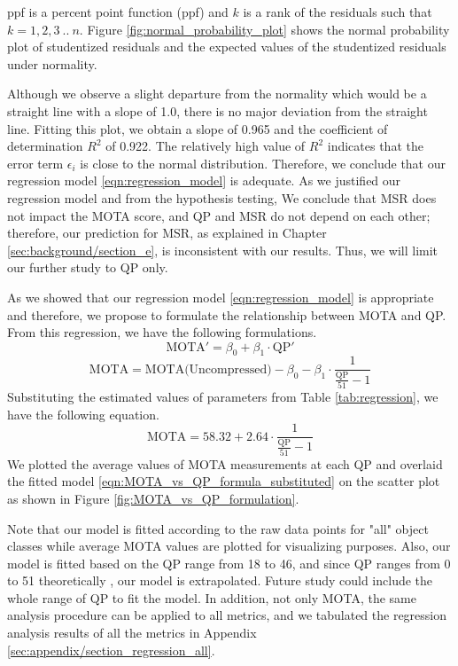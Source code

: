 ppf is a percent point function (ppf) and $k$ is a rank of the residuals such that $k=1,2,3~..~n$. Figure \ref{fig:normal_probability_plot} shows the normal probability plot of studentized residuals and the expected values of the studentized residuals under normality.

Although we observe a slight departure from the normality which would be a straight line with a slope of 1.0, there is no major deviation from the straight line. Fitting this plot, we obtain a slope of 0.965 and the coefficient of determination $R^2$ of 0.922. The relatively high value of $R^2$ indicates that the error term $\epsilon_i$ is close to the normal distribution. Therefore, we conclude that our regression model \eqref{eqn:regression_model} is adequate. As we justified our regression model and from the hypothesis testing, We conclude that MSR does not impact the MOTA score, and QP and MSR do not depend on each other; therefore, our prediction for MSR, as explained in Chapter \ref{sec:background/section_e}, is inconsistent with our results. Thus, we will limit our further study to QP only.

As we showed that our regression model \eqref{eqn:regression_model} is appropriate and therefore, we propose to formulate the relationship between MOTA and QP. From this regression, we have the following formulations.
\begin{equation}
    \text{MOTA}' = \beta_0 + \beta_1 \cdot \text{QP}'
\end{equation}
\begin{equation}
    \text{MOTA} = \text{MOTA(Uncompressed)} - \beta_0 - \beta_1 \cdot \frac{1}{ \frac{\text{QP}}{51} - 1 }
\label{eqn:MOTA_vs_QP_formula}
\end{equation}
Substituting the estimated values of parameters from Table \ref{tab:regression}, we have the following equation.
\begin{equation}
    \text{MOTA} = 58.32 + 2.64 \cdot \frac{1}{ \frac{\text{QP}}{51} - 1 }
\label{eqn:MOTA_vs_QP_formula_substituted}
\end{equation}
We plotted the average values of MOTA measurements at each QP and overlaid the fitted model \ref{eqn:MOTA_vs_QP_formula_substituted} on the scatter plot as shown in Figure \ref{fig:MOTA_vs_QP_formulation}.

Note that our model is fitted according to the raw data points for "all" object classes while average MOTA values are plotted for visualizing purposes. Also, our model is fitted based on the QP range from 18 to 46, and since QP ranges from 0 to 51 theoretically \cite{sullivan_overview_2012}, our model is extrapolated. Future study could include the whole range of QP to fit the model. In addition, not only MOTA, the same analysis procedure can be applied to all metrics, and we tabulated the regression analysis results of all the metrics in Appendix \ref{sec:appendix/section_regression_all}.

